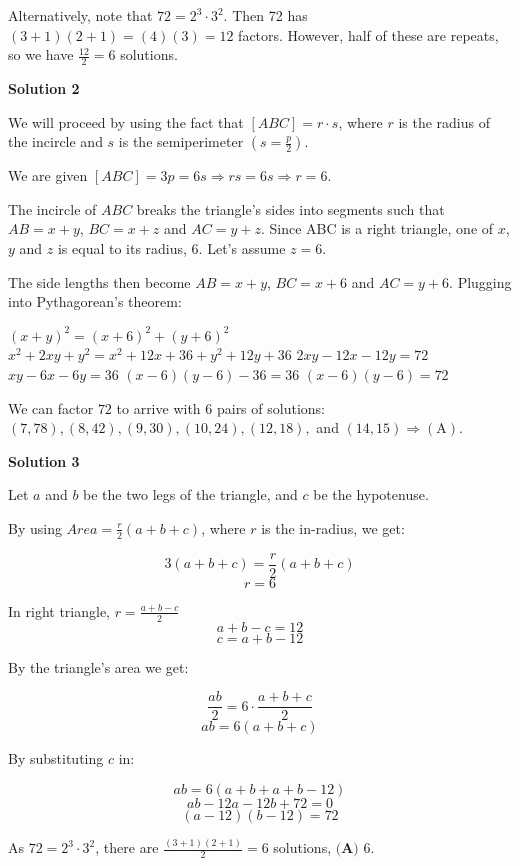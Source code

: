 \begin{enumerate}
 
Alternatively, note that $72 = 2^3 \cdot 3^2$. Then 72 has $(3+1)(2+1) = (4)(3) = 12$ factors. However, half of these are repeats, so we have $\frac{12}{2} = 6$ solutions.

 



\textbf{Solution 2}

We will proceed by using the fact that $[ABC] = r\cdot s$, where $r$ is the radius of the incircle and $s$ is the semiperimeter $\left(s = \frac{p}{2}\right)$.

 We are given $[ABC] = 3p = 6s \Rightarrow rs = 6s \Rightarrow r = 6$.

 The incircle of $ABC$ breaks the triangle's sides into segments such that $AB = x + y$, $BC = x + z$ and $AC = y + z$. Since ABC is a right triangle, one of $x$, $y$ and $z$ is equal to its radius, 6. Let's assume $z = 6$.

 The side lengths then become $AB = x + y$, $BC = x + 6$ and $AC = y + 6$. Plugging into Pythagorean's theorem:

 $(x + y)^2 = (x+6)^2 + (y + 6)^2$
$x^2 + 2xy + y^2 = x^2 + 12x + 36 + y^2 + 12y + 36$
$2xy - 12x - 12y = 72$
$xy - 6x - 6y = 36$
$(x - 6)(y - 6) - 36 = 36$
$(x - 6)(y - 6) = 72$

 We can factor $72$ to arrive with $6$ pairs of solutions: $(7, 78), (8,42), (9, 30), (10, 24), (12, 18),$ and $(14, 15) \Rightarrow \mathrm{(A)}$.

 



\textbf{Solution 3}

Let $a$ and $b$ be the two legs of the triangle, and $c$ be the hypotenuse.

 By using $Area = \frac{r}{2} (a+b+c)$, where $r$ is the in-radius, we get:

 
 \[3(a+b+c) = \frac{r}{2} (a+b+c)\]
 \[r=6\]

 In right triangle, $r = \frac{a+b-c}{2}$
 \[a+b-c = 12\]
 \[c = a + b - 12\]

 
By the triangle's area we get:

 
 \[\frac{ab}{2} = 6 \cdot \frac{a+b+c}{2}\]
 \[ab = 6(a+b+c)\]

 By substituting $c$ in:

 
 \[ab = 6(a+b+a + b - 12)\]
 \[ab - 12a - 12b + 72 = 0\]
 \[(a - 12)(b - 12) = 72\]

 As $72 = 2^3 \cdot 3^2$, there are $\frac{(3+1)(2+1)}{2} = 6$ solutions, $\boxed{\textbf{(A) } 6}$.


\end{enumerate}
